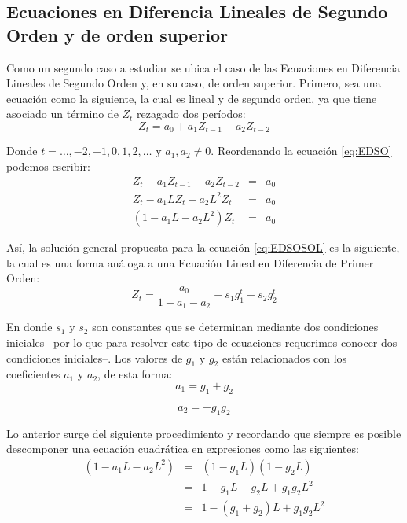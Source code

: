 \documentclass[
]{book}
\begin{document}
\hypertarget{ecuaciones-en-diferencia-lineales-de-segundo-orden-y-de-orden-superior}{%
\subsection{Ecuaciones en Diferencia Lineales de Segundo Orden y de orden superior}\label{ecuaciones-en-diferencia-lineales-de-segundo-orden-y-de-orden-superior}}

Como un segundo caso a estudiar se ubica el caso de las Ecuaciones en Diferencia Lineales de Segundo Orden y, en su caso, de orden superior. Primero, sea una ecuación como la siguiente, la cual es lineal y de segundo orden, ya que tiene asociado un término de \(Z_t\) rezagado dos períodos:
\begin{equation}
    Z_t = a_0 + a_1 Z_{t-1} + a_2 Z_{t-2}
    \label{eq:EDSO}
\end{equation}

Donde \(t = \ldots, -2, -1, 0, 1, 2, \ldots\) y \(a_1, a_2 \neq 0\). Reordenando la ecuación \eqref{eq:EDSO} podemos escribir:
\begin{eqnarray}
    Z_t - a_1 Z_{t-1} - a_2 Z_{t-2} & = & a_0 \nonumber \\
    Z_t - a_1 L Z_{t} - a_2 L^2 Z_{t} & = & a_0 \nonumber \\
    (1 - a_1 L - a_2 L^2)Z_t & = & a_0 
    \label{eq:EDSOSOL}
\end{eqnarray}

Así, la solución general propuesta para la ecuación \eqref{eq:EDSOSOL} es la siguiente, la cual es una forma análoga a una Ecuación Lineal en Diferencia de Primer Orden:
\begin{equation}
    Z_t = \frac{a_0}{1 - a_1 - a_2} + s_1 g^t_1 + s_2 g^t_2
    \label{eq:SOLGEN2}
\end{equation}

En donde \(s_1\) y \(s_2\) son constantes que se determinan mediante dos condiciones iniciales --por lo que para resolver este tipo de ecuaciones requerimos conocer dos condiciones iniciales--. Los valores de \(g_1\) y \(g_2\) están relacionados con los coeficientes \(a_1\) y \(a_2\), de esta forma:
\begin{equation}
  a_1  =  g_1 + g_2
  \label{eq:a1}
\end{equation}

\begin{equation}
    a_2  =  - g_1 g_2
    \label{eq:a2}
\end{equation}

Lo anterior surge del siguiente procedimiento y recordando que siempre es posible descomponer una ecuación cuadrática en expresiones como las siguientes:
\begin{eqnarray}
    (1 - a_1 L - a_2 L^2) & = & (1 - g_1 L)(1 - g_2 L) \nonumber \\
    & = & 1 - g_1 L - g_2 L + g_1 g_2 L^2 \nonumber \\
    & = & 1 - (g_1 + g_2) L + g_1 g_2 L^2
    \label{eq:eqcaracteristica}
\end{eqnarray}
\end{document}
